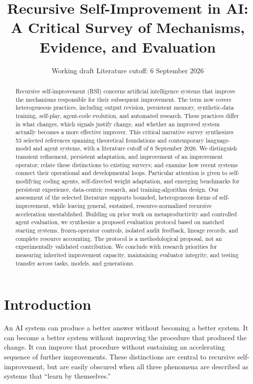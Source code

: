 \documentclass[11pt,american,]{article}
\title{Recursive Self-Improvement in AI: A Critical Survey of Mechanisms,
Evidence, and Evaluation}
\date{Working draft \textbar{} Literature cutoff: 6 September 2026}
\begin{document}
\maketitle
\begin{abstract}
Recursive self-improvement (RSI) concerns artificial intelligence
systems that improve the mechanisms responsible for their subsequent
improvement. The term now covers heterogeneous practices, including
output revision, persistent memory, synthetic-data training, self-play,
agent-code evolution, and automated research. These practices differ in
what changes, which signals justify change, and whether an improved
system actually becomes a more effective improver. This critical
narrative survey synthesizes 53 selected references spanning theoretical
foundations and contemporary language-model and agent systems, with a
literature cutoff of 6 September 2026. We distinguish transient
refinement, persistent adaptation, and improvement of an improvement
operator; relate these distinctions to existing surveys; and examine how
recent systems connect their operational and developmental loops.
Particular attention is given to self-modifying coding agents,
self-directed weight adaptation, and emerging benchmarks for persistent
experience, data-centric research, and training-algorithm design. Our
assessment of the selected literature supports bounded, heterogeneous
forms of self-improvement, while leaving general, sustained,
resource-normalized recursive acceleration unestablished. Building on
prior work on metaproductivity and controlled agent evaluation, we
synthesize a proposed evaluation protocol based on matched starting
systems, frozen-operator controls, isolated audit feedback, lineage
records, and complete resource accounting. The protocol is a
methodological proposal, not an experimentally validated contribution.
We conclude with research priorities for measuring inherited improvement
capacity, maintaining evaluator integrity, and testing transfer across
tasks, models, and generations.
\end{abstract}

\hypertarget{introduction}{%
\section{Introduction}\label{introduction}}

An AI system can produce a better answer without becoming a better
system. It can become a better system without improving the procedure
that produced the change. It can improve that procedure without
sustaining an accelerating sequence of further improvements. These
distinctions are central to recursive self-improvement, but are easily
obscured when all three phenomena are described as systems that ``learn
by themselves.''
\end{document}
